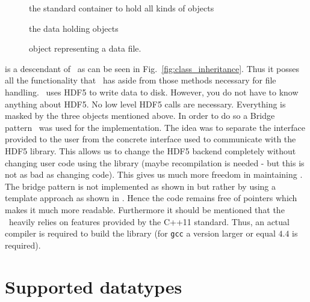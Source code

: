 \begin{description}
\item[\nxgroup] the standard container to hold all kinds of objects
\item[\nxfield] the data holding objects
\item[\nxfile] object representing a data file.
\end{description}
\nxfile is a descendant of \nxgroup\ as can be seen in
Fig.~\ref{fig:class_inheritance}. Thus it posses all the functionality that 
\nxgroup\ has aside from those methods necessary for file handling. 
\pninx\ uses HDF5 to write data to disk. However, you do not have to know 
anything about HDF5. No low level HDF5 calls are necessary. Everything is 
masked by the three objects mentioned above. 
In order to do so a Bridge pattern~\cite{book:gof} was used for the
implementation. The idea was to separate the interface provided to the user from the 
concrete interface used to communicate with the HDF5 library. 
This allows us to change the HDF5 backend completely without changing 
user code using the library (maybe recompilation is needed - but this is not as
bad as changing code). This gives us much more freedom in maintaining \pninx.
The bridge pattern is not implemented as shown in \cite{book:gof} but rather 
by using a template approach as shown  in \cite{book:alexandrescu}.
Hence the code remains free of pointers which makes it much more readable. 
Furthermore it should be mentioned that the \pninx\ heavily relies on features 
provided by the C++11 standard. Thus, an actual compiler is required to 
build the library (for {\tt gcc} a version larger or equal $4.4$ is required).
 

\section{Supported datatypes}

